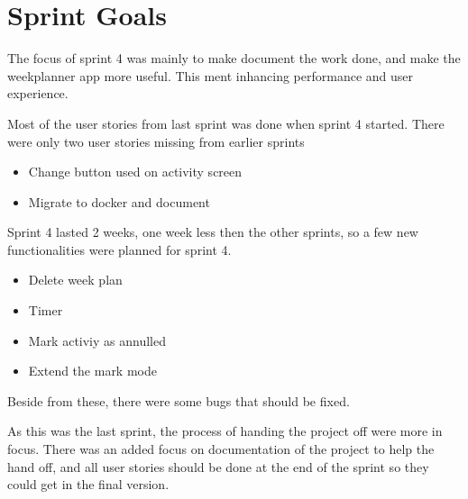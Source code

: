 \section{Sprint Goals}
The focus of sprint 4 was mainly to make document the work done, and make the weekplanner app more useful. This ment inhancing performance and user experience. 

Most of the user stories from last sprint was done when sprint 4 started. There were only two user stories missing from earlier sprints
\begin{itemize}
    \item Change button used on activity screen
    \item Migrate to docker and document
\end{itemize}

Sprint 4 lasted 2 weeks, one week less then the other sprints, so a few new functionalities were planned for sprint 4. 
\begin{itemize}
    \item Delete week plan
    \item Timer
    \item Mark activiy as annulled
    \item Extend the mark mode
\end{itemize}

Beside from these, there were some bugs that should be fixed. 

As this was the last sprint, the process of handing the project off were more in focus. There was an added focus on documentation of the project to help the hand off, and all user stories should be done at the end of the sprint so they could get in the final version.

